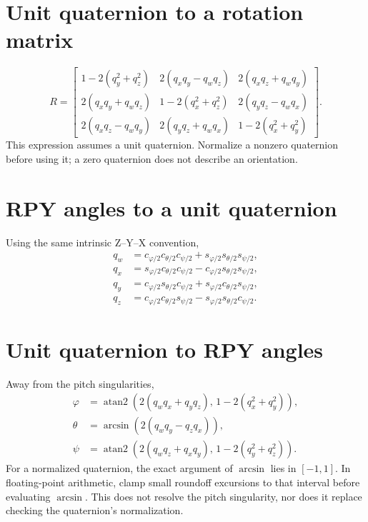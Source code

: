 \section*{Unit quaternion to a rotation matrix}
\[
 R=\begin{bmatrix}
 1-2(q_y^2+q_z^2)&2(q_xq_y-q_wq_z)&2(q_xq_z+q_wq_y)\\
 2(q_xq_y+q_wq_z)&1-2(q_x^2+q_z^2)&2(q_yq_z-q_wq_x)\\
 2(q_xq_z-q_wq_y)&2(q_yq_z+q_wq_x)&1-2(q_x^2+q_y^2)
 \end{bmatrix}.
\]
This expression assumes a unit quaternion. Normalize a nonzero quaternion
before using it; a zero quaternion does not describe an orientation.

\section*{RPY angles to a unit quaternion}
Using the same intrinsic Z--Y--X convention,
\[
 \begin{aligned}
 q_w&=c_{\varphi/2}c_{\theta/2}c_{\psi/2}
       +s_{\varphi/2}s_{\theta/2}s_{\psi/2},\\
 q_x&=s_{\varphi/2}c_{\theta/2}c_{\psi/2}
       -c_{\varphi/2}s_{\theta/2}s_{\psi/2},\\
 q_y&=c_{\varphi/2}s_{\theta/2}c_{\psi/2}
       +s_{\varphi/2}c_{\theta/2}s_{\psi/2},\\
 q_z&=c_{\varphi/2}c_{\theta/2}s_{\psi/2}
       -s_{\varphi/2}s_{\theta/2}c_{\psi/2}.
 \end{aligned}
\]

\section*{Unit quaternion to RPY angles}
Away from the pitch singularities,
\[
 \begin{aligned}
 \varphi&=\operatorname{atan2}\!\left(2(q_wq_x+q_yq_z),\,
                      1-2(q_x^2+q_y^2)\right),\\
 \theta&=\arcsin\!\left(2(q_wq_y-q_zq_x)\right),\\
 \psi&=\operatorname{atan2}\!\left(2(q_wq_z+q_xq_y),\,
                      1-2(q_y^2+q_z^2)\right).
 \end{aligned}
\]
For a normalized quaternion, the exact argument of $\arcsin$ lies in $[-1,1]$.
In floating-point arithmetic, clamp small roundoff excursions to that interval
before evaluating $\arcsin$. This does not resolve the pitch singularity,
nor does it replace checking the quaternion's normalization.

